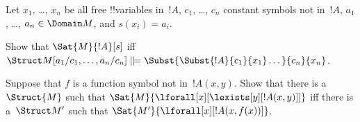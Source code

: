 \documentclass[../../include/open-logic-section]{subfiles}
\begin{document}
\begin{prob}
\begin{enumerate}

\end{enumerate}
Let $x_1$, \dots, $x_n$ be all free !!{variable}s in~$!A$,
$c_1$, \dots, $c_n$ constant symbols not in~$!A$,
$a_1$, \dots, $a_n \in \Domain M$, and $s(x_i) = a_i$.

Show that $\Sat{M}{!A}[s]$ iff $\Struct M[a_1/c_1,\dots,a_n/c_n]
\VDash \Subst{\Subst{!A}{c_1}{x_1}\dots}{c_n}{x_n}$.
\end{prob}

\begin{prob}
  Suppose that $f$ is a function symbol not in~$!A(x,y)$. Show that
  there is a~$\Struct{M}$ such that
  $\Sat{M}{\lforall[x][\lexists[y][!A(x,y)]]}$ iff there is a~$\Struct
  M'$ such that $\Sat{M'}{\lforall[x][!A(x,f(x))]}$.
\end{prob}
\end{document}
